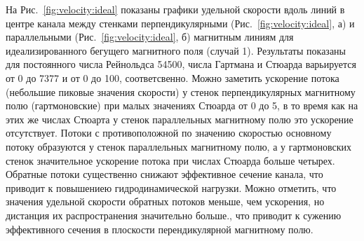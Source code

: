 На Рис.~\ref{fig:velocity:ideal} показаны графики удельной скорости вдоль линий в центре канала между стенками перпендикулярными (Рис.~\ref{fig:velocity:ideal}, а) и параллельными (Рис.~\ref{fig:velocity:ideal}, б) магнитным линиям для идеализированного бегущего магнитного поля (случай 1). Результаты показаны для постоянного числа Рейнольдса 54500,  числа Гартмана и Стюарда варьируется от 0 до 7377 и  от 0 до 100, соответсвенно. Можно заметить ускорение потока (небольшие пиковые значения скорости) у стенок перпендикулярных магнитному полю (гартмоновские) при малых значениях Стюарда от 0 до 5, в то время как на этих же числах Стюарта у стенок параллельных магнитному полю это ускорение отсутствует. Потоки с противоположной по значению скоростью основному потоку образуются у стенок параллельных магнитному полю, а у гартмоновских стенок значительное ускорение потока при числах Стюарда больше четырех. Обратные потоки существенно снижают эффективное сечение канала, что приводит к повышениею гидродинамической нагрузки. Можно отметить, что значения удельной скорости обратных потоков меньше, чем ускорения, но дистанция их распространения значительно больше., что приводит к сужению эффективного сечения в плоскости перендикулярной магнитному полю. 

